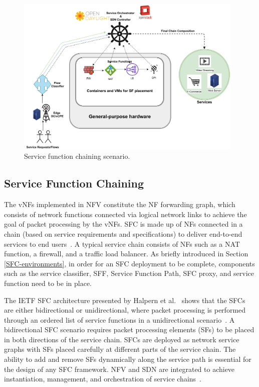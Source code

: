 \documentclass[futureinternet,review,accept,pdftex,moreauthors]{Definitions/mdpi}
\begin{document}
\begin{figure}[H]%
\includegraphics[width=0.97\textwidth]{SFC.pdf}
\caption{Service function chaining scenario.}
\label{Service Function Chaining}
\end{figure}


\subsection{Service Function Chaining}
\label{SFC}
The vNFs implemented in NFV constitute the NF forwarding graph, which consists of network functions connected via logical network links to achieve the goal of packet processing by the vNFs. SFC is made up of NFs connected in a chain (based on service requirements and specifications) to deliver end-to-end services to end users~\cite{etsi2013network, wang2021availability}. A typical service chain consists of NFs such as a NAT function, a firewall, and a traffic load balancer. As briefly introduced in Section \ref{SFC-environments}, in order for an SFC deployment to be complete, components such as the service classifier, SFF, Service Function Path, SFC proxy, and service function need to be in place. 



The IETF SFC architecture presented by Halpern {et al.}~\cite{halpern2015service} shows that the SFCs are either bidirectional or unidirectional, where packet processing is performed through an ordered list of service functions in a unidirectional scenario~\cite{halpern2015service}. A bidirectional SFC scenario requires packet processing elements (SFs) to be placed in both directions of the service chain. SFCs are deployed as network service graphs with SFs placed carefully at different parts of the service chain. The ability to add and remove SFs dynamically along the service path is essential for the design of any SFC framework. NFV and SDN are integrated to achieve instantiation, management, and orchestration of service chains~\cite{ozdem2021subscriber}. 
\end{document}
